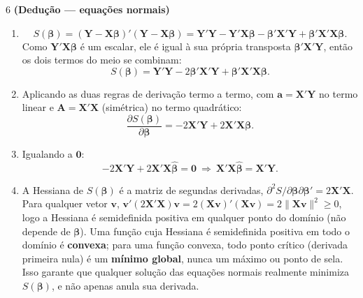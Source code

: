 \documentclass[11pt]{article}
\begin{document}
\begin{questao}{6} \textbf{(Dedução --- equações normais)}
\end{questao}
\begin{solucao}
\begin{enumerate}[label=(\alph*)]
  \item
  $$
  S(\boldsymbol\beta) = (\mathbf{Y}-\mathbf{X}\boldsymbol\beta)'(\mathbf{Y}-\mathbf{X}\boldsymbol\beta)
  = \mathbf{Y}'\mathbf{Y} - \mathbf{Y}'\mathbf{X}\boldsymbol\beta - \boldsymbol\beta'\mathbf{X}'\mathbf{Y}
  + \boldsymbol\beta'\mathbf{X}'\mathbf{X}\boldsymbol\beta.
  $$
  Como $\mathbf{Y}'\mathbf{X}\boldsymbol\beta$ é um escalar, ele é igual à sua própria transposta
  $\boldsymbol\beta'\mathbf{X}'\mathbf{Y}$, então os dois termos do meio se combinam:
  $$
  S(\boldsymbol\beta) = \mathbf{Y}'\mathbf{Y} - 2\boldsymbol\beta'\mathbf{X}'\mathbf{Y} +
  \boldsymbol\beta'\mathbf{X}'\mathbf{X}\boldsymbol\beta.
  $$
  \item Aplicando as duas regras de derivação termo a termo, com $\mathbf{a} =
  \mathbf{X}'\mathbf{Y}$ no termo linear e $\mathbf{A} = \mathbf{X}'\mathbf{X}$ (simétrica) no
  termo quadrático:
  $$
  \frac{\partial S(\boldsymbol\beta)}{\partial \boldsymbol\beta} = -2\mathbf{X}'\mathbf{Y} +
  2\mathbf{X}'\mathbf{X}\boldsymbol\beta.
  $$
  \item Igualando a $\mathbf{0}$:
  $$
  -2\mathbf{X}'\mathbf{Y} + 2\mathbf{X}'\mathbf{X}\hat{\boldsymbol\beta} = \mathbf{0}
  \ \Longrightarrow\ \mathbf{X}'\mathbf{X}\hat{\boldsymbol\beta} = \mathbf{X}'\mathbf{Y}.
  $$
  \item A Hessiana de $S(\boldsymbol\beta)$ é a matriz de segundas derivadas,
  $\partial^2 S/\partial\boldsymbol\beta\partial\boldsymbol\beta' = 2\mathbf{X}'\mathbf{X}$. Para
  qualquer vetor $\mathbf{v}$, $\mathbf{v}'(2\mathbf{X}'\mathbf{X})\mathbf{v} =
  2(\mathbf{X}\mathbf{v})'(\mathbf{X}\mathbf{v}) = 2\lVert \mathbf{X}\mathbf{v}\rVert^2 \geq 0$,
  logo a Hessiana é semidefinida positiva em qualquer ponto do domínio (não depende de
  $\boldsymbol\beta$). Uma função cuja Hessiana é semidefinida positiva em todo o domínio é
  \textbf{convexa}; para uma função convexa, todo ponto crítico (derivada primeira nula) é um
  \textbf{mínimo global}, nunca um máximo ou ponto de sela. Isso garante que qualquer solução das
  equações normais realmente minimiza $S(\boldsymbol\beta)$, e não apenas anula sua derivada.
\end{enumerate}
\end{solucao}
\end{document}
